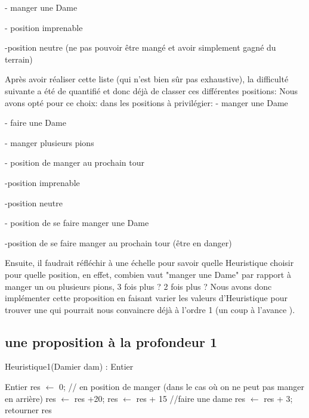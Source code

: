 \documentclass[12,french]{report}
\begin{document}
- manger une Dame

- position imprenable
 
 -position neutre (ne pas pouvoir être mangé et avoir simplement gagné du terrain)

Après avoir réaliser cette liste (qui n'est bien sûr pas exhaustive), la difficulté suivante a été de quantifié et donc déjà de classer ces différentes positions:
Nous avons opté pour ce choix:
dans les positions à privilégier:
- manger une Dame

- faire une Dame

- manger plusieurs pions

- position de manger au prochain tour

-position imprenable

-position neutre

- position de se faire manger une Dame

-position de se faire manger au prochain tour (être en danger)


Ensuite, il faudrait réfléchir à une échelle pour savoir quelle Heuristique choisir pour quelle position, en effet, combien vaut "manger une Dame" par rapport à manger un ou plusieurs pions, 3 fois plus ? 2 fois plus ?
Nous avons donc implémenter cette proposition en faisant varier les valeurs d'Heuristique pour trouver une qui pourrait nous convaincre déjà à l'ordre 1 (un coup à l'avance ).


\subsection{une proposition à la profondeur 1}

\begin{algorithm}
	\caption{Heuristique1(Damier dam) : Entier}
	\begin{algorithmic}
		\State  Entier res $\leftarrow$ 0;
		 // en position de manger (dans le cas où on ne peut pas manger en arrière)
		\State res $\leftarrow$ res +20;
		\EndIf
		\State res $\leftarrow$ res + 15 //faire une dame
		\EndIf
		\State res $\leftarrow$ res + 3;
		\EndIf
		\State retourner res
	\end{algorithmic}
\end{algorithm}\vspace{0.4cm}
\end{document}
